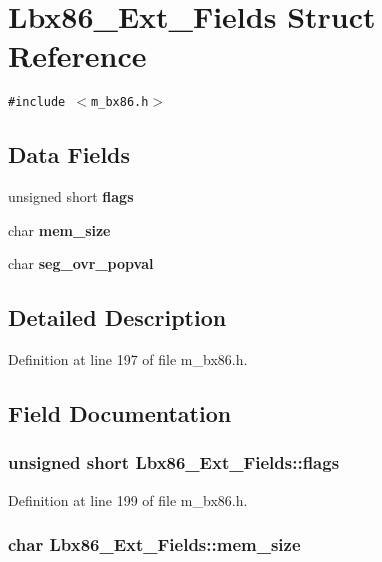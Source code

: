 \section{Lbx86\_\-Ext\_\-Fields Struct Reference}
\label{structLbx86__Ext__Fields}
{\tt \#include $<$m\_\-bx86.h$>$}

\subsection*{Data Fields}
\begin{CompactItemize}
\item 
unsigned short \bf{flags}
\item 
char \bf{mem\_\-size}
\item 
char \bf{seg\_\-ovr\_\-popval}
\end{CompactItemize}


\subsection{Detailed Description}




Definition at line 197 of file m\_\-bx86.h.

\subsection{Field Documentation}
\subsubsection{\setlength{\rightskip}{0pt plus 5cm}unsigned short \bf{Lbx86\_\-Ext\_\-Fields::flags}}\label{structLbx86__Ext__Fields_9dfffc65a4ba040b2dce561ba266774b}




Definition at line 199 of file m\_\-bx86.h.
\subsubsection{\setlength{\rightskip}{0pt plus 5cm}char \bf{Lbx86\_\-Ext\_\-Fields::mem\_\-size}}\label{structLbx86__Ext__Fields_eddb82bb03a57052495bec0e9181b928}




